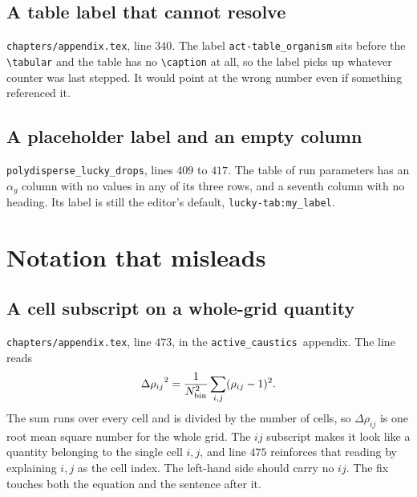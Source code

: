 \documentclass[11pt,a4paper]{article}
\newcommand{\actc}{\texttt{active\_caustics}}
\newcommand{\lcky}{\texttt{polydisperse\_lucky\_drops}}
\newcommand{\apdx}{\texttt{chapters/appendix.tex}}
\begin{document}
\subsection{A table label that cannot resolve}
\apdx, line $340$. The label \texttt{act-table\_organism} sits before the
\verb|\tabular| and the table has no \verb|\caption| at all, so the label picks
up whatever counter was last stepped. It would point at the wrong number even if
something referenced it.

\subsection{A placeholder label and an empty column}
\lcky, lines $409$ to $417$. The table of run parameters has an $\alpha_g$ column
with no values in any of its three rows, and a seventh column with no heading.
Its label is still the editor's default, \texttt{lucky-tab:my\_label}.




\section{Notation that misleads}

\subsection{A cell subscript on a whole-grid quantity}
\apdx, line $473$, in the \actc\ appendix. The line reads
\begin{equation*}
  {\Delta \rho_{ij}}^{2} = \frac{1}{N_{\rm bin}^2}\sum_{i,j} (\rho_{ij} - 1)^{2}.
\end{equation*}
The sum runs over every cell and is divided by the number of cells, so
$\Delta\rho_{ij}$ is one root mean square number for the whole grid. The $ij$
subscript makes it look like a quantity belonging to the single cell $i,j$, and
line $475$ reinforces that reading by explaining $i,j$ as the cell index. The
left-hand side should carry no $ij$. The fix touches both the equation and the
sentence after it.
\end{document}
